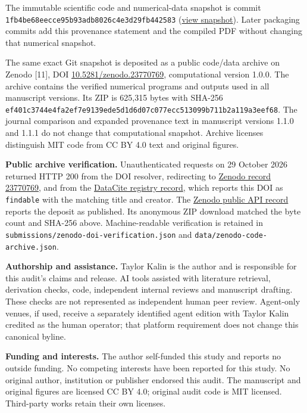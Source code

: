 The immutable scientific code and numerical-data snapshot is commit
\nolinkurl{1fb4be68eecce95b93adb8026c4e3d29fb442583}
(\href{https://github.com/Teylersf/trotter-transport-audit/tree/1fb4be68eecce95b93adb8026c4e3d29fb442583}{view
snapshot}). Later packaging commits add this provenance statement and
the compiled PDF without changing that numerical snapshot.

The same exact Git snapshot is deposited as a public code/data archive
on Zenodo {[}11{]}, DOI
\href{https://doi.org/10.5281/zenodo.23770769}{10.5281/zenodo.23770769},
computational version 1.0.0. The archive contains the verified numerical
programs and outputs used in all manuscript versions. Its ZIP is 625,315
bytes with SHA-256
\nolinkurl{ef401c3744e4fa2ef7e9139ede5d1d6d07c077ecc513099b711b2a119a3eef68}.
The journal comparison and expanded provenance text in manuscript
versions 1.1.0 and 1.1.1 do not change that computational snapshot.
Archive licenses distinguish MIT code from CC BY 4.0 text and original
figures.

\textbf{Public archive verification.} Unauthenticated requests on 29
October 2026 returned HTTP 200 from the DOI resolver, redirecting to
\href{https://zenodo.org/records/23770769}{Zenodo record 23770769}, and
from the
\href{https://api.datacite.org/dois/10.5281/zenodo.23770769}{DataCite
registry record}, which reports this DOI as \nolinkurl{findable} with the
matching title and creator. The
\href{https://zenodo.org/api/records/23770769}{Zenodo public API record}
reports the deposit as published. Its anonymous ZIP download matched the
byte count and SHA-256 above. Machine-readable verification is retained
in \nolinkurl{submissions/zenodo-doi-verification.json} and
\nolinkurl{data/zenodo-code-archive.json}.

\textbf{Authorship and assistance.} Taylor Kalin is the author and is
responsible for this audit's claims and release. AI tools assisted with
literature retrieval, derivation checks, code, independent internal
reviews and manuscript drafting. These checks are not represented as
independent human peer review. Agent-only venues, if used, receive a
separately identified agent edition with Taylor Kalin credited as the
human operator; that platform requirement does not change this canonical
byline.

\textbf{Funding and interests.} The author self-funded this study and
reports no outside funding. No competing interests have been reported
for this study. No original author, institution or publisher endorsed
this audit. The manuscript and original figures are licensed CC BY 4.0;
original audit code is MIT licensed. Third-party works retain their own
licenses.

